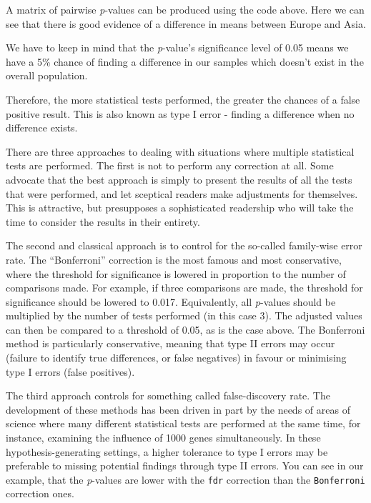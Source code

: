 \documentclass[
  12pt,
  krantz2]{krantz}
\begin{document}

A matrix of pairwise \emph{p}-values can be produced using the code above.
Here we can see that there is good evidence of a difference in means between Europe and Asia.

We have to keep in mind that the \emph{p}-value's significance level of 0.05 means we have a 5\% chance of finding a difference in our samples which doesn't exist in the overall population.

Therefore, the more statistical tests performed, the greater the chances of a false positive result.
This is also known as type I error - finding a difference when no difference exists.

There are three approaches to dealing with situations where multiple statistical tests are performed.
The first is not to perform any correction at all.
Some advocate that the best approach is simply to present the results of all the tests that were performed, and let sceptical readers make adjustments for themselves.
This is attractive, but presupposes a sophisticated readership who will take the time to consider the results in their entirety.

The second and classical approach is to control for the so-called family-wise error rate.
The ``Bonferroni'' correction is the most famous and most conservative, where the threshold for significance is lowered in proportion to the number of comparisons made.
For example, if three comparisons are made, the threshold for significance should be lowered to 0.017.
Equivalently, all \emph{p}-values should be multiplied by the number of tests performed (in this case 3).
The adjusted values can then be compared to a threshold of 0.05, as is the case above.
The Bonferroni method is particularly conservative, meaning that type II errors may occur (failure to identify true differences, or false negatives) in favour or minimising type I errors (false positives).

The third approach controls for something called false-discovery rate.
The development of these methods has been driven in part by the needs of areas of science where many different statistical tests are performed at the same time, for instance, examining the influence of 1000 genes simultaneously.
In these hypothesis-generating settings, a higher tolerance to type I errors may be preferable to missing potential findings through type II errors.
You can see in our example, that the \emph{p}-values are lower with the \texttt{fdr} correction than the \texttt{Bonferroni} correction ones.
\end{document}
